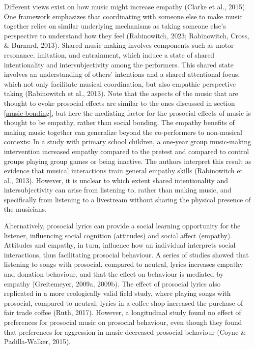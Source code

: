 \documentclass[
  man,floatsintext]{apa6}
\begin{document}
Different views exist on how music might increase empathy (Clarke et al., 2015). One framework emphasizes that coordinating with someone else to make music together relies on similar underlying mechanisms as taking someone else's perspective to understand how they feel (Rabinowitch, 2023; Rabinowitch, Cross, \& Burnard, 2013). Shared music-making involves components such as motor resonance, imitation, and entrainment, which induce a state of shared intentionality and intersubjectivity among the performers. This shared state involves an understanding of others' intentions and a shared attentional focus, which not only facilitate musical coordination, but also empathic perspective taking (Rabinowitch et al., 2013). Note that the aspects of the music that are thought to evoke prosocial effects are similar to the ones discussed in section \ref{music-bonding}, but here the mediating factor for the prosocial effects of music is thought to be empathy, rather than social bonding. The empathy benefits of making music together can generalize beyond the co-performers to non-musical contexts: In a study with primary school children, a one-year group music-making intervention increased empathy compared to the pretest and compared to control groups playing group games or being inactive. The authors interpret this result as evidence that musical interactions train general empathy skills (Rabinowitch et al., 2013). However, it is unclear to which extent shared intentionality and intersubjectivity can arise from listening to, rather than making music, and specifically from listening to a livestream without sharing the physical presence of the musicians.

Alternatively, prosocial lyrics can provide a social learning opportunity for the listener, influencing social cognition (attitudes) and social affect (empathy). Attitudes and empathy, in turn, influence how an individual interprets social interactions, thus facilitating prosocial behaviour. A series of studies showed that listening to songs with prosocial, compared to neutral, lyrics increases empathy and donation behaviour, and that the effect on behaviour is mediated by empathy (Greitemeyer, 2009a, 2009b). The effect of prosocial lyrics also replicated in a more ecologically valid field study, where playing songs with prosocial, compared to neutral, lyrics in a coffee shop increased the purchase of fair trade coffee (Ruth, 2017). However, a longitudinal study found no effect of preferences for prosocial music on prosocial behaviour, even though they found that preferences for aggression in music decreased prosocial behaviour (Coyne \& Padilla-Walker, 2015).
\end{document}
